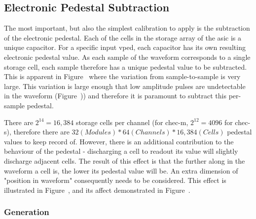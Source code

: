 \subsection{Electronic Pedestal Subtraction}

The most important, but also the simplest calibration to apply is the subtraction of the electronic pedestal. Each of the cells in the storage array of the \gls{asic} is a unique capacitor. For a specific input \gls{vped}, each capacitor has its own resulting electronic pedestal value. As each sample of the waveform corresponds to a single storage cell, each sample therefore has a unique pedestal value to be subtracted. This is apparent in Figure~ where the variation from sample-to-sample is very large. This variation is large enough that low amplitude pulses are undetectable in the waveform (Figure~)) and therefore it is paramount to subtract this per-sample pedestal.

There are $2^{14} = 16,384$ storage cells per channel (for \gls{chec-m}, $2^{12} = 4096$ for \gls{chec-s}), therefore there are $32 (Modules) * 64 (Channels) * 16,384 (Cells)$ pedestal values to keep record of. However, there is an additional contribution to the behaviour of the pedestal - discharging a cell to readout its value will slightly discharge adjacent cells. The result of this effect is that the further along in the waveform a cell is, the lower its pedestal value will be. An extra dimension of "position in waveform" consequently needs to be considered. This effect is illustrated in Figure~, and its affect demonstrated in Figure~.

\subsubsection{Generation}


